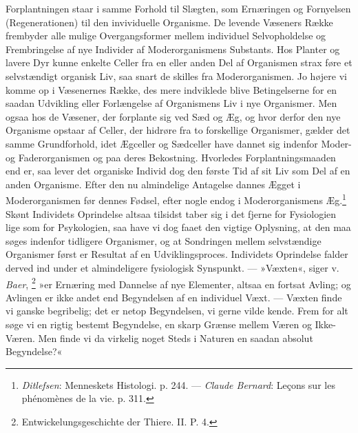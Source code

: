 \documentclass[12pt,a4paper,openany]{book}
\newcommand{\opage}[1]{\marginnote{\footnotesize\textit{[#1]}}}
\begin{document}
\opage{297}Forplantningen staar i samme Forhold til Slægten, som
Ernæringen og Fornyelsen (Regenerationen) til den invividuelle
Organisme. De levende Væseners Række frembyder alle mulige
Overgangsformer mellem individuel Selvopholdelse og Frembringelse af nye
Individer af Moderorganismens Substants. Hos Planter og lavere Dyr kunne
enkelte Celler fra en eller anden Del af Organismen strax føre et
selvstændigt organisk Liv, saa snart de skilles fra Moderorganismen. Jo
højere vi komme op i Væsenernes Række, des mere indviklede blive
Betingelserne for en saadan Udvikling eller Forlængelse af Organismens
Liv i nye Organismer. Men ogsaa hos de Væsener, der forplante sig ved
Sæd og Æg, og hvor derfor den nye Organisme opstaar af Celler, der
hidrøre fra to forskellige Organismer, gælder det samme Grundforhold,
idet Ægceller og Sædceller have dannet sig indenfor Moder- og
Faderorganismen og paa deres Bekostning. Hvorledes Forplantningsmaaden
end er, saa lever det organiske Individ dog den første Tid af sit Liv
som Del af en anden Organisme. Efter den nu almindelige Antagelse dannes
Ægget i Moderorganismen før dennes Fødsel, efter nogle endog i
Moderorganismens Æg.\footnote[1]{\emph{Ditlefsen}: Menneskets Histologi.
p. 244. --- \emph{Claude Bernard}: Leçons sur les phénomènes de la vie.
p. 311.} Skønt Individets Oprindelse altsaa tilsidst taber sig i det
fjerne for Fysiologien lige som for Psykologien, saa have vi dog faaet
den vigtige Oplysning, at den maa søges indenfor tidligere Organismer,
og at Sondringen mellem selvstændige Organismer først er Resultat af en
Udviklingsproces. Individets Oprindelse falder derved ind under et
almindeligere fysiologisk Synspunkt. --- »Væxten«, siger v. \emph{Baer},
\footnote[2]{Entwickelungsgeschichte der Thiere. II. P. 4.} »er Ernæring
med Dannelse af nye Elementer, altsaa en fortsat Avling; og Avlingen er
ikke andet end Begyndelsen af en individuel Væxt. --- Væxten finde vi
ganske begribelig; det er netop Begyndelsen, vi gerne vilde kende. Frem
for alt søge vi en rigtig bestemt Begyndelse, en skarp Grænse mellem
Væren og Ikke-Væren. Men finde vi da virkelig noget Steds i Naturen en
saadan absolut Begyndelse?«
\end{document}
